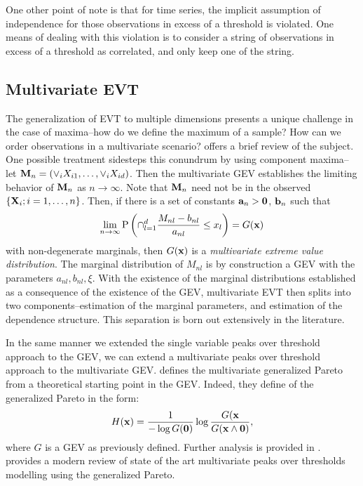 One other point of note is that for time series, the implicit assumption of independence for those
  observations in excess of a threshold is violated.  One means of dealing with this violation is
  to consider a string of observations in excess of a threshold as correlated, and only keep one
  of the string.

\subsection{Multivariate EVT}
The generalization of EVT to multiple dimensions presents a unique challenge in the case of maxima--how
  do we define the maximum of a sample?  How can we order observations in a multivariate scenario?
  \cite{rootzen2006} offers a brief review of the subject.  One possible treatment sidesteps this
  conundrum by using component maxima--let ${\bf M}_n = \left(\vee_i X_{i1},\ldots,\vee_i X_{id}\right)$.
  Then the multivariate GEV establishes the limiting behavior of ${\bf M}_n$ as $n\to\infty$.  Note
  that ${\bf M}_n$ need not be in the observed $\left\lbrace{\bf X}_i; i = 1,\ldots,n\right\rbrace$.
  Then, if there is a set of constants ${\bf a}_n > {\bf 0}$, ${\bf b}_n$ such that
  \begin{equation*}
    \lim\limits_{n\to\infty}\text{P}\left(\cap_{l = 1}^d \frac{M_{nl} - b_{nl}}{a_{nl}} \leq x_l\right) = G({\bf x})
  \end{equation*}
  with non-degenerate marginals, then $G({\bf x})$ is a \emph{multivariate extreme value distribution}.
  The marginal distribution of $M_{nl}$ is by construction a GEV with the parameters $a_{nl}, b_{nl}, \xi$.
  With the existence of the marginal distributions established as a consequence of the existence of the
  GEV, multivariate EVT then splits into two components--estimation of the marginal parameters, and
  estimation of the dependence structure.  This separation is born out extensively in the literature.


In the same manner we extended the single variable peaks over threshold approach to the GEV, we can
  extend a multivariate peaks over threshold approach to the multivariate GEV.  \cite{rootzen2006}
  defines the multivariate generalized Pareto from a theoretical starting point in the GEV.  Indeed,
  they define of the generalized Pareto in the form:
  \begin{equation*}
    H({\bf x}) = \frac{1}{-\log G({\bf 0})}\log\frac{G({\bf x}}{G({\bf x}\wedge {\bf 0})},
  \end{equation*}
  where $G$ is a GEV as previously defined.  Further analysis is provided in \cite{falk2008}.
  \cite{rootzen2018} provides a modern review of state of the art multivariate peaks over thresholds
  modelling using the generalized Pareto.

